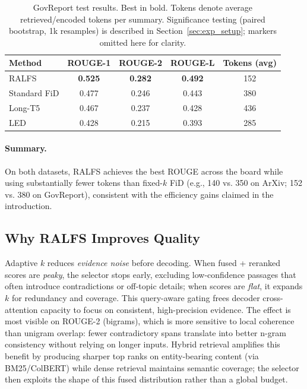 \documentclass[11pt,a4paper]{article}
\begin{document}
\begin{table}[H]
\centering
\small
\setlength{\tabcolsep}{8pt}
\begin{tabular}{lcccc}
\toprule
\textbf{Method} & \textbf{ROUGE-1} & \textbf{ROUGE-2} & \textbf{ROUGE-L} & \textbf{Tokens (avg)} \\
\midrule
RALFS & \textbf{0.525} & \textbf{0.282} & \textbf{0.492} & 152 \\
Standard FiD & 0.477 & 0.246 & 0.443 & 380 \\
Long-T5 & 0.467 & 0.237 & 0.428 & 436 \\
LED & 0.428 & 0.215 & 0.393 & 285 \\
\bottomrule
\end{tabular}
\caption{GovReport test results. Best in bold. Tokens denote average retrieved/encoded tokens per summary. Significance testing (paired bootstrap, 1k resamples) is described in Section~\ref{sec:exp_setup}; markers omitted here for clarity.}
\label{tab:results_govreport}
\end{table}

\paragraph{Summary.} On both datasets, RALFS achieves the best ROUGE across the board while using substantially fewer tokens than fixed-$k$ FiD (e.g., 140 vs. 350 on ArXiv; 152 vs. 380 on GovReport), consistent with the efficiency gains claimed in the introduction.

\subsection{Why RALFS Improves Quality}

Adaptive $k$ reduces \emph{evidence noise} before decoding. When fused + reranked scores are \emph{peaky}, the selector stops early, excluding low-confidence passages that often introduce contradictions or off-topic details; when scores are \emph{flat}, it expands $k$ for redundancy and coverage. This query-aware gating frees decoder cross-attention capacity to focus on consistent, high-precision evidence. The effect is most visible on ROUGE-2 (bigrams), which is more sensitive to local coherence than unigram overlap: fewer contradictory spans translate into better n-gram consistency without relying on longer inputs. Hybrid retrieval amplifies this benefit by producing sharper top ranks on entity-bearing content (via BM25/ColBERT) while dense retrieval maintains semantic coverage; the selector then exploits the shape of this fused distribution rather than a global budget.
\end{document}
